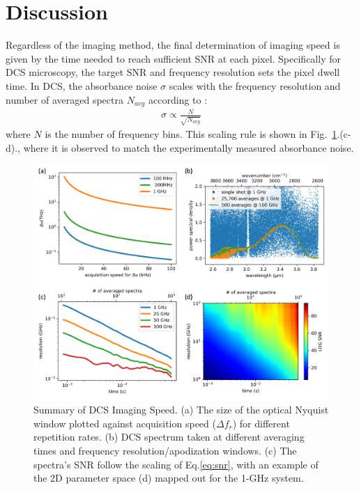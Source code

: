 \documentclass{optica-article}
\begin{document}
\section{Discussion}
Regardless of the imaging method, the final determination of imaging speed is given by the time needed to reach sufficient SNR at each pixel. Specifically for DCS microscopy, the target SNR and frequency resolution sets the pixel dwell time. In DCS, the absorbance noise $\sigma$ scales with the frequency resolution and number of averaged spectra $N_{avg}$ according to \cite{newburySensitivityCoherentDualcomb2010}: 
% 
\begin{align}
    \sigma \propto \frac{N}{\sqrt{N_{avg}}}
    \label{eq:snr}
\end{align}
% 
where $N$ is the number of frequency bins. This scaling rule is shown in \mbox{Fig. \ref{fig:snr_analysis}.(c-d).}, where it is observed to match the experimentally measured absorbance noise. 


\begin{figure}[h]
    \centering
    \includegraphics[width=\linewidth]{snr_analysis.png}
    \caption{Summary of DCS Imaging Speed. (a) The size of the optical Nyquist window plotted against acquisition speed (\mbox{$\Delta f_r$}) for different repetition rates. (b) DCS spectrum taken at different averaging times and frequency resolution/apodization windows. (c) The spectra's SNR follow the scaling of \mbox{Eq.\ref{eq:snr}}, with an example of the 2D parameter space (d) mapped out for the 1-GHz system.}
    \label{fig:snr_analysis}
\end{figure}
\end{document}
